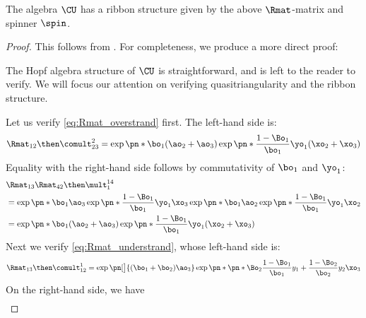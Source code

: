 \begin{lemma}
        The algebra $\CU$ has a ribbon structure given by the above
        $\Rmat$-matrix and spinner $\spin$.
\end{lemma}
\begin{proof}
        This follows from \cite[theorem~29]{BV}. For completeness, we produce a
        more direct proof:

        The Hopf algebra structure of $\CU$ is straightforward, and is left to
        the reader to verify. We will focus our attention on verifying
        quasitriangularity and the ribbon structure.

        Let us verify \cref{eq:Rmat_overstrand} first. The left-hand side is:
        \begin{equation}
                \Rmat_{12} \then \comult^{2}_{23} =
                \exp\pn*{\bo_1(\ao_2+\ao_3)}
                \exp\pn*{\frac{1-\Bo_1}{\bo_1}\yo_1(\xo_2+\xo_3)}
        \end{equation}
        Equality with the right-hand side follows by commutativity of $\bo_1$
        and $\yo_1$:
        \begin{equation}\begin{aligned}
                &\Rmat_{13} \Rmat_{42} \then \mult^{14}_{1}\\
                &=
                \exp\pn*{\bo_1\ao_3}
                \exp\pn*{\frac{1-\Bo_1}{\bo_1}\yo_1\xo_3}
                \exp\pn*{\bo_1\ao_2}
                \exp\pn*{\frac{1-\Bo_1}{\bo_1}\yo_1\xo_2}
                \\&=
                \exp\pn*{\bo_1(\ao_2+\ao_3)}
                \exp\pn*{\frac{1-\Bo_1}{\bo_1}\yo_1(\xo_2+\xo_3)}
        \end{aligned}\end{equation}
        Next we verify \cref{eq:Rmat_understrand}, whose left-hand side is:
        \begin{equation}
                \Rmat_{13}\then\comult^{1}_{12} =
                \exp\pn[\big]{(\bo_1+\bo_2)\ao_3}
                \exp\pn*{
                        \pn*{
                                \Bo_2\frac{1-\Bo_1}{\bo_1}y_1+
                                \frac{1-\Bo_2}{\bo_2}y_2
                        }
                        \xo_3
                }
        \end{equation}
        On the right-hand side, we have
        \begin{equation}
        \begin{aligned}

\end{aligned}
\end{equation}
\end{proof}
